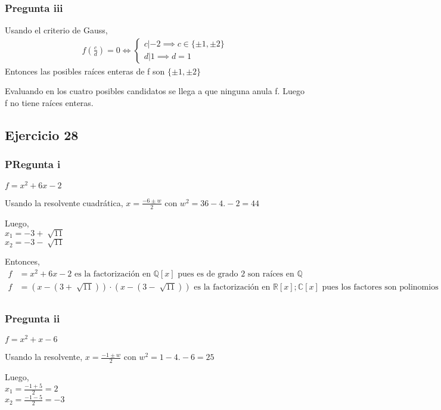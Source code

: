 \subsubsection{Pregunta iii}
Usando el criterio de Gauss, 
\begin{align*}
    f(\frac{c}{d}) = 0 \iff \begin{cases}
        c|-2 \implies c \in \{ \pm 1, \pm 2 \} \\
        d|1 \implies d = 1
    \end{cases}
\end{align*}
Entonces las posibles raíces enteras de f son $ \{ \pm 1, \pm 2 \} $

Evaluando en los cuatro posibles candidatos se llega a que ninguna anula f. Luego f no tiene raíces enteras.

\subsection{Ejercicio 28}
\subsubsection{PRegunta i}
$ f = x^2 +6x - 2 $

Usando la resolvente cuadrática, $ x = \frac{-6 \pm w }{2} $ con $ w^2 = 36-4.-2 = 44 $

Luego, \\
$ x_1 = -3 + \sqrt[]{11} $ \\
$ x_2 = -3 - \sqrt[]{11} $ 

Entonces,
\begin{align*}
    f &= x^2 + 6x - 2 \text{ es la factorización en } \mathbb{Q}[x] \text{ pues es de grado 2 son raíces en } \mathbb{Q} \\
    f &= (x-(3+\sqrt[]{11})) \cdot (x-(3-\sqrt[]{11})) \text{ es la factorización en } \mathbb{R}[x]; \mathbb{C}[x] \text{ pues los factores son polinomios irred de gr 1} \\
\end{align*}
\subsubsection{Pregunta ii}
$ f = x^2 + x - 6 $

Usando la resolvente, $ x = \frac{-1 \pm w}{2} $ con $ w^2 = 1-4.-6 = 25 $

Luego, \\
$ x_1 = \frac{-1+5}{2} = 2 $ \\
$ x_2 = \frac{-1-5}{2} = -3 $ 

